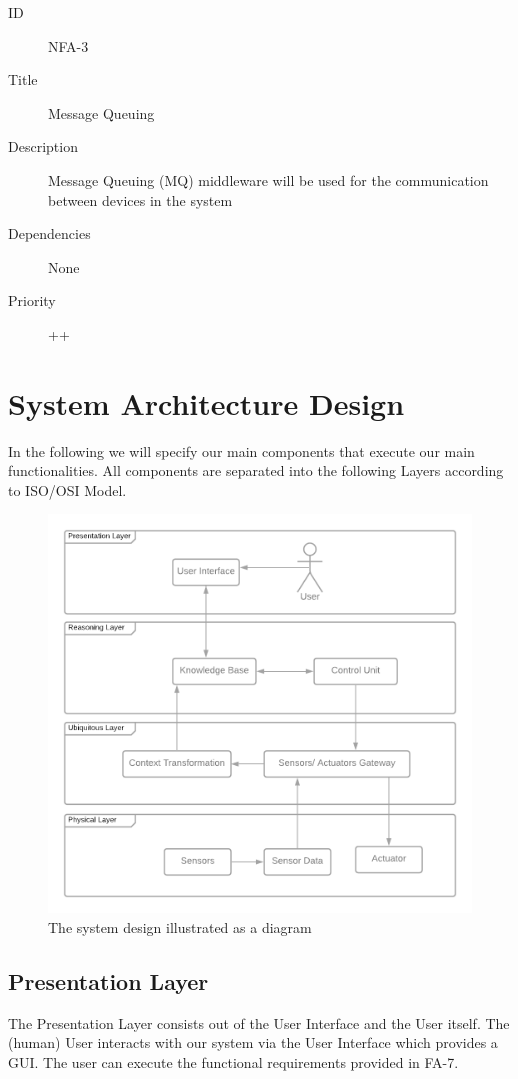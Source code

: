 \documentclass[runningheads]{llncs}
\begin{document}
\begin{description}
    \item[ID] NFA-3
    \item[Title] Message Queuing
    \item[Description] Message Queuing (MQ) middleware will be used for the communication between devices in the system
    \item[Dependencies] None
    \item[Priority] ++
\end{description}

\section{System Architecture Design}

In the following we will specify our main components that execute our main functionalities. All components are separated into the following Layers according to ISO/OSI Model. 

\begin{figure}
    \centering
    \includegraphics[width=\linewidth]{img/system-design.png}
    \caption{The system design illustrated as a diagram}
    \label{fig:system-design}
\end{figure}

\subsection{Presentation Layer}
The Presentation Layer consists out of the User Interface and the User itself. The (human) User interacts with our system via the User Interface which provides a GUI. The user can execute the functional requirements provided in FA-7. 
\end{document}
